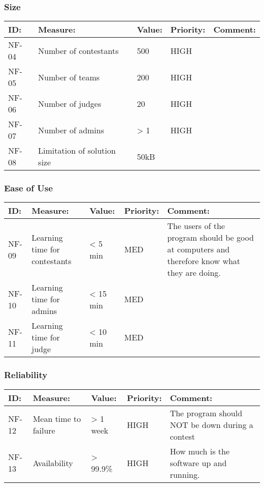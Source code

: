 \subsubsection{Size}
\begin{supertabular}{|l|p{5cm}|p{1.8cm}|l|p{4.4cm}|}
\hline
\textbf{ID:} & \textbf{Measure:} & \textbf{Value:} & \textbf{Priority:} & \textbf{Comment:}\\
\hline
NF-04 &
Number of contestants &
500 &
HIGH &
\\\hline

NF-05 &
Number of teams &
200 &
HIGH &

\\\hline

NF-06 &
Number of judges &
20 &
HIGH &

\\\hline

NF-07 &
Number of admins &
{\textgreater} 1 &
HIGH &

\\\hline

NF-08 &
Limitation of solution size &
50kB &

\\\hline
\end{supertabular}

\subsubsection{Ease of Use}

\begin{supertabular}{|l|p{5cm}|p{1.8cm}|l|p{4.4cm}|}
\hline
\textbf{ID:} & \textbf{Measure:} & \textbf{Value:} & \textbf{Priority:} & \textbf{Comment:}\\
\hline
NF-09 & Learning time for contestants & {\textless} 5 min & MED & The users of
the program should be good at computers and therefore know what they are
doing.\\
\hline

NF-10 & Learning time for admins & {\textless} 15 min & MED &
\\\hline

NF-11 &
Learning time for judge &
{\textless} 10 min &
MED &
\\\hline

\end{supertabular}
\subsubsection{Reliability}
\begin{supertabular}{|l|p{5cm}|p{1.8cm}|l|p{4.4cm}|}
\hline
\textbf{ID:} & \textbf{Measure:} & \textbf{Value:} & \textbf{Priority:} & \textbf{Comment:}\\
\hline

NF-12 & Mean time to failure &
{\textgreater} 1 week & HIGH & The program should NOT be down during a
contest\\
\hline

NF-13 &
Availability &
{\textgreater} 99.9\% &
HIGH &
How much is the software up and running.\\
\hline


\end{supertabular}

